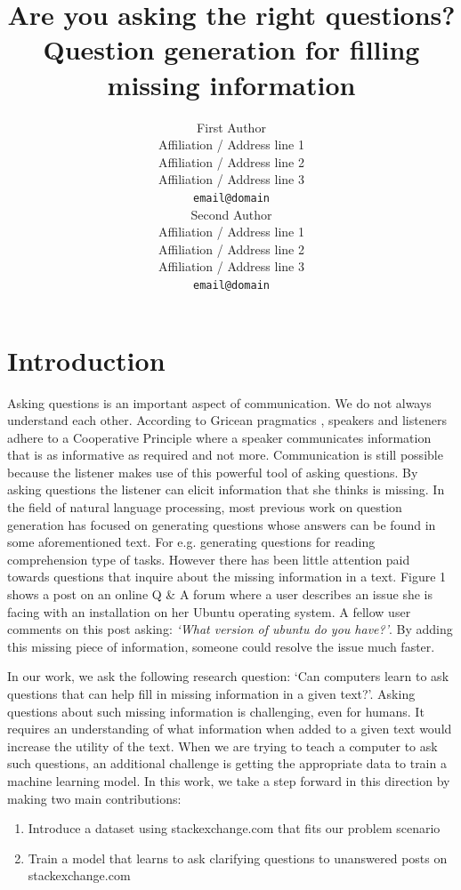\documentclass[11pt]{article}
\title{Are you asking the right questions? \\ Question generation for filling missing information}
\author{First Author \\
  Affiliation / Address line 1 \\
  Affiliation / Address line 2 \\
  Affiliation / Address line 3 \\
  {\tt email@domain} \\\And
  Second Author \\
  Affiliation / Address line 1 \\
  Affiliation / Address line 2 \\
  Affiliation / Address line 3 \\
  {\tt email@domain} \\}
\date{}
\begin{document}
\maketitle
\begin{abstract}

\end{abstract}
\section{Introduction}

Asking questions is an important aspect of communication. We do not always understand each other. According to Gricean pragmatics \cite{grice1975logic}, speakers and listeners adhere to a Cooperative Principle where a speaker communicates information that is as informative as required and not more. Communication is still possible because the listener makes use of this powerful tool of asking questions. By asking questions the listener can elicit information that she thinks is missing. In the field of natural language processing, most previous work on question generation has focused on generating questions whose answers can be found in some aforementioned text. For e.g. generating questions for reading comprehension type of tasks. However there has been little attention paid towards questions that inquire about the missing information in a text. Figure 1 shows a post on an online Q \& A forum where a user describes an issue she is facing with an installation on her Ubuntu operating system. A fellow user comments on this post asking: \textit{`What version of ubuntu do you have?'}.  By adding this missing piece of information, someone could resolve the issue much faster. 

In our work, we ask the following research question: `Can computers learn to ask questions that can help fill in missing information in a given text?'. Asking questions about such missing information is challenging, even for humans. It requires an understanding of what information when added to a given text would increase the utility of the text. When we are trying to teach a computer to ask such questions, an additional challenge is getting the appropriate data to train a machine learning model. In this work, we take a step forward in this direction by making two main contributions:
\begin{enumerate}
\item Introduce a dataset using stackexchange.com that fits our problem scenario
\item Train a model that learns to ask clarifying questions to unanswered posts on stackexchange.com
\end{enumerate}
\end{document}
